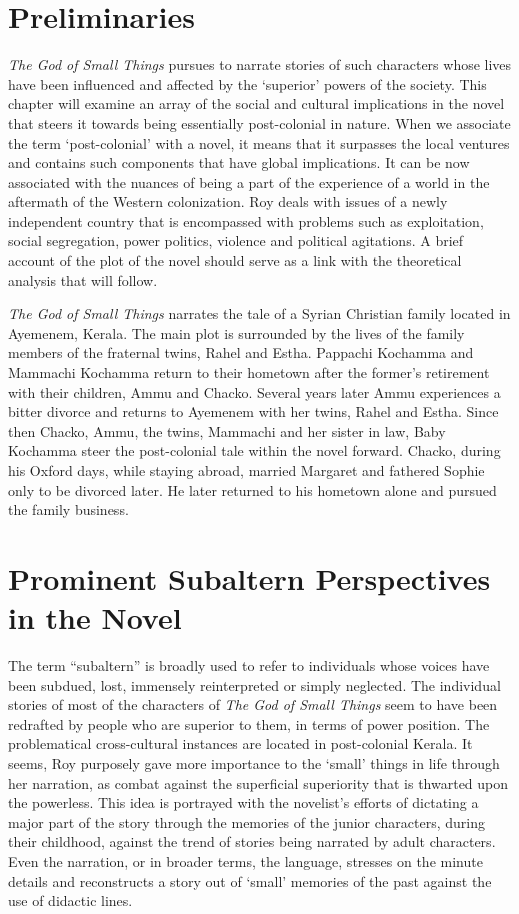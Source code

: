 
\section{Preliminaries}

\emph{The God of Small Things} pursues to narrate stories of such characters whose lives have been influenced and affected by the `superior' powers of the society. This chapter will examine an array of the social and cultural implications in the novel that steers it towards being essentially post-colonial in nature. When we associate the term `post-colonial' with a novel, it means that it surpasses the local ventures and contains such components that have global implications. It can be now associated with the nuances of being a part of the experience of a world in the aftermath of the Western colonization. Roy deals with issues of a newly independent country that is encompassed with problems such as exploitation, social segregation, power politics, violence and political agitations. A brief account of the plot of the novel should serve as a link with the theoretical analysis that will follow. 

\emph{The God of Small Things} narrates the tale of a Syrian Christian family located in Ayemenem, Kerala. The main plot is surrounded by the lives of the family members of the fraternal twins, Rahel and Estha. Pappachi Kochamma and Mammachi Kochamma return to their hometown after the former's retirement with their children, Ammu and Chacko. Several years later Ammu experiences a bitter divorce and returns to Ayemenem with her twins, Rahel and Estha. Since then Chacko, Ammu, the twins, Mammachi and her sister in law, Baby Kochamma steer the post-colonial tale within the novel forward. Chacko, during his Oxford days, while staying abroad, married Margaret and fathered Sophie only to be divorced later. He later returned to his hometown alone and pursued the family business. 

\section{Prominent Subaltern Perspectives in the Novel}

The term ``subaltern'' is broadly used to refer to individuals whose voices have been subdued, lost, immensely reinterpreted or simply neglected. The individual stories of most of the characters of \emph{The God of Small Things} seem to have been redrafted by people who are superior to them, in terms of power position. The problematical cross-cultural instances are located in post-colonial Kerala. It seems, Roy purposely gave more importance to the `small' things in life through her narration, as combat against the superficial superiority that is thwarted upon the powerless. This idea is portrayed with the novelist's efforts of dictating a major part of the story through the memories of the junior characters, during their childhood, against the trend of stories being narrated by adult characters. Even the narration, or in broader terms, the language, stresses on the minute details and reconstructs a story out of `small' memories of the past against the use of didactic lines. 

